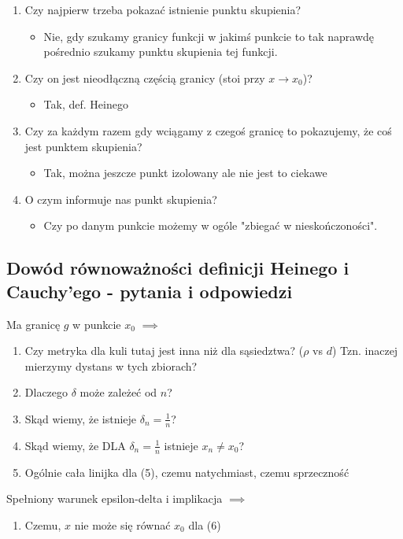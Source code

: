 \documentclass{article}
\begin{document}
\begin{enumerate}
    \item Czy najpierw trzeba pokazać istnienie punktu skupienia?
    \begin{itemize}
        \item Nie, gdy szukamy granicy funkcji w jakimś punkcie to tak naprawdę pośrednio szukamy punktu skupienia tej funkcji.
    \end{itemize}
    \item Czy on jest nieodłączną częścią granicy (stoi przy \(x \to x_0\))?
    \begin{itemize}
        \item Tak, def. Heinego
    \end{itemize}
    \item Czy za każdym razem gdy wciągamy z czegoś granicę to pokazujemy, że coś jest punktem skupienia?
    \begin{itemize}
        \item Tak, można jeszcze punkt izolowany ale nie jest to ciekawe
    \end{itemize}
    \item O czym informuje nas punkt skupienia?
    \begin{itemize}
        \item Czy po danym punkcie możemy w ogóle "zbiegać w nieskończoności".
    \end{itemize}
\end{enumerate}

\subsection{Dowód równoważności definicji Heinego i Cauchy'ego - pytania i odpowiedzi}

Ma granicę \(g\) w punkcie \(x_0\) \(\implies\)

\begin{enumerate}
    \item Czy metryka dla kuli tutaj jest inna niż dla sąsiedztwa? (\(\rho\) vs \(d\)) Tzn. inaczej mierzymy dystans w tych zbiorach?
    \item Dlaczego \(\delta\) może zależeć od \(n\)?
    \item Skąd wiemy, że istnieje \(\delta_n = \frac{1}{n}\)?
    \item Skąd wiemy, że DLA \(\delta_n = \frac{1}{n}\) istnieje \(x_n \neq x_0\)?
    \item Ogólnie cała linijka dla (5), czemu natychmiast, czemu sprzeczność
\end{enumerate}

Spełniony warunek epsilon-delta i implikacja \(\implies\)

\begin{enumerate}
    \item Czemu, \(x\) nie może się równać \(x_0\) dla (6)
\end{enumerate}
\end{document}
